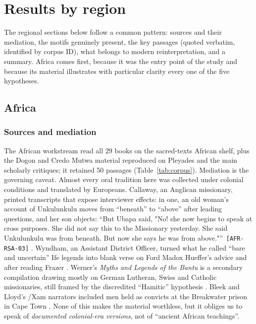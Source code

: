 \documentclass[11pt,a4paper]{article}
\newcommand{\pid}[1]{\texttt{\small #1}}
\begin{document}
\section{Results by region}\label{sec:results}

The regional sections below follow a common pattern: sources and their mediation, the motifs genuinely present, the key passages (quoted verbatim, identified by corpus ID), what belongs to modern reinterpretation, and a summary. Africa comes first, because it was the entry point of the study and because its material illustrates with particular clarity every one of the five hypotheses.

\subsection{Africa}\label{sec:africa}

\subsubsection{Sources and mediation}

The African workstream read all 29 books on the sacred-texts African shelf, plus the Dogon and Credo Mutwa material reproduced on Pleyades and the main scholarly critiques; it retained 50 passages (Table~\ref{tab:corpus}). Mediation is the governing caveat. Almost every oral tradition here was collected under colonial conditions and translated by Europeans. Callaway, an Anglican missionary, printed transcripts that expose interviewer effects: in one, an old woman's account of Unkulunkulu moves from ``beneath'' to ``above'' after leading questions, and her son objects: \enquote{But Ubapa said, "No! she now begins to speak at cross purposes. She did not say this to the Missionary yesterday. She said Unkulunkulu was from beneath. But now she says he was from above."}~\pid{[AFR-RSA-03]} \parencite{callaway1870religious}. Wyndham, an Assistant District Officer, turned what he called ``bare and uncertain'' Ife legends into blank verse on Ford Madox Hueffer's advice and after reading Frazer \parencite{wyndham1921ife}. Werner's \emph{Myths and Legends of the Bantu} is a secondary compilation drawing mostly on German Lutheran, Swiss and Catholic missionaries, still framed by the discredited ``Hamitic'' hypothesis \parencite{werner1933bantu}. Bleek and Lloyd's /Xam narrators included men held as convicts at the Breakwater prison in Cape Town \parencite{bleeklloyd1911}. None of this makes the material worthless, but it obliges us to speak of \emph{documented colonial-era versions}, not of ``ancient African teachings''.
\end{document}
